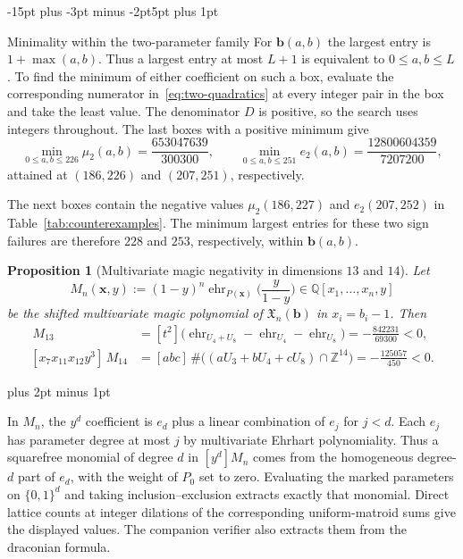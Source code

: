 \documentclass[11pt,letterpaper]{article}
\makeatletter
\renewcommand{\subsection}{\@startsection{subsection}{2}{\z@}%
  {-15pt plus -3pt minus -2pt}{5pt plus 1pt}%
  {\normalfont\bfseries\raggedright}}
\renewenvironment{proof}[1][\proofname]{%
  \par\pushQED{\qed}\normalfont
  \topsep9pt plus 2pt minus 1pt\relax
  \trivlist\item[\hskip\labelsep\itshape #1\@addpunct{.}]\ignorespaces
}{\popQED\endtrivlist\@endpefalse}
\theoremstyle{result}
\newtheorem{proposition}[theorem]{Proposition}
\theoremstyle{remark}
\newcommand{\ZZ}{\mathbb{Z}}
\newcommand{\QQ}{\mathbb{Q}}
\newcommand{\X}{\mathfrak{X}}
\newcommand{\vb}{\mathbf{b}}
\newcommand{\vx}{\mathbf{x}}
\newcommand{\ehr}{\operatorname{ehr}}
\makeatother
\begin{document}
\subsection{Minimality within the two-parameter family}
For $\vb(a,b)$ the largest entry is $1+\max(a,b)$. Thus a largest entry at most $L+1$ is equivalent to $0\le a,b\le L$. To find the minimum of either coefficient on such a box, evaluate the corresponding numerator in~\eqref{eq:two-quadratics} at every integer pair in the box and take the least value. The denominator $D$ is positive, so the search uses integers throughout. The last boxes with a positive minimum give
\[
\min_{0\le a,b\le 226}\mu_2(a,b)=\frac{653047639}{300300},
\qquad
\min_{0\le a,b\le 251}e_2(a,b)=\frac{12800604359}{7207200},
\]
attained at $(186,226)$ and $(207,251)$, respectively.

The next boxes contain the negative values $\mu_2(186,227)$ and $e_2(207,252)$ in Table~\ref{tab:counterexamples}. The minimum largest entries for these two sign failures are therefore $228$ and $253$, respectively, within $\vb(a,b)$.

\begin{samepage}
\begin{proposition}[Multivariate magic negativity in dimensions $13$ and $14$]\label{prop:multiv}
Let
\[
M_n(\vx,y):=(1-y)^n\ehr_{P(\vx)}\bigl(\frac{y}{1-y}\bigr)\in\QQ[x_1,\dots,x_n,y]
\]
be the shifted multivariate magic polynomial of $\X_n(\vb)$ in $x_i=b_i-1$. Then
\begin{align*}
[x_6 x_{10} y^2]\,M_{13} &= [t^2]\bigl(\ehr_{U_4+U_8} - \ehr_{U_4} - \ehr_{U_8}\bigr) = -\frac{842231}{69300} < 0, \\
[x_7 x_{11} x_{12} y^3]\,M_{14} &= [abc]\,\#\bigl((a U_3 + b U_4 + c U_8)\cap\ZZ^{14}\bigr) = -\frac{125057}{450} < 0.
\end{align*}
\end{proposition}
\end{samepage}

\begin{proof}
In $M_n$, the $y^d$ coefficient is $e_d$ plus a linear combination of $e_j$ for $j<d$. Each $e_j$ has parameter degree at most $j$ by multivariate Ehrhart polynomiality. Thus a squarefree monomial of degree $d$ in $[y^d]M_n$ comes from the homogeneous degree-$d$ part of $e_d$, with the weight of $P_0$ set to zero. Evaluating the marked parameters on $\{0,1\}^d$ and taking inclusion--exclusion extracts exactly that monomial. Direct lattice counts at integer dilations of the corresponding uniform-matroid sums give the displayed values. The companion verifier also extracts them from the draconian formula.
\end{proof}
\end{document}
